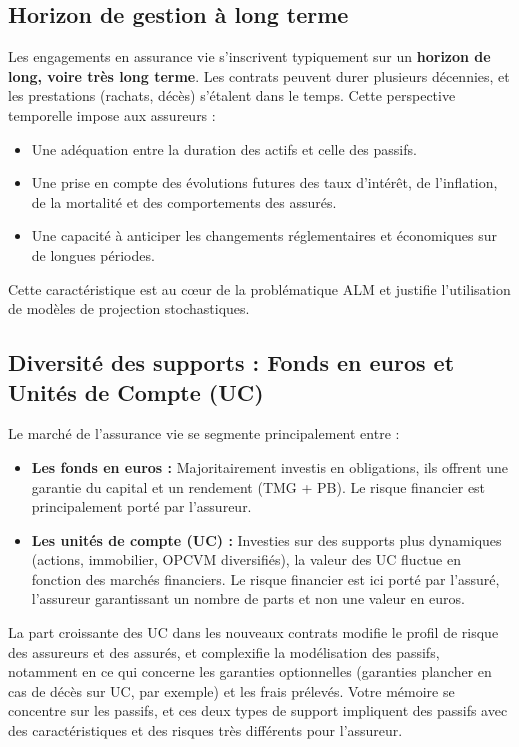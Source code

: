 \subsection{Horizon de gestion à long terme}
\label{subsec:horizon_long_terme}
Les engagements en assurance vie s'inscrivent typiquement sur un \textbf{horizon de long, voire très long terme}. Les contrats peuvent durer plusieurs décennies, et les prestations (rachats, décès) s'étalent dans le temps. Cette perspective temporelle impose aux assureurs :
\begin{itemize}
    \item Une adéquation entre la duration des actifs et celle des passifs.
    \item Une prise en compte des évolutions futures des taux d'intérêt, de l'inflation, de la mortalité et des comportements des assurés.
    \item Une capacité à anticiper les changements réglementaires et économiques sur de longues périodes.
\end{itemize}
Cette caractéristique est au cœur de la problématique ALM et justifie l'utilisation de modèles de projection stochastiques.

\subsection{Diversité des supports : Fonds en euros et Unités de Compte (UC)}
\label{subsec:fonds_euros_uc}
Le marché de l'assurance vie se segmente principalement entre :
\begin{itemize}
    \item \textbf{Les fonds en euros :} Majoritairement investis en obligations, ils offrent une garantie du capital et un rendement (TMG + PB). Le risque financier est principalement porté par l'assureur.
    \item \textbf{Les unités de compte (UC) :} Investies sur des supports plus dynamiques (actions, immobilier, OPCVM diversifiés), la valeur des UC fluctue en fonction des marchés financiers. Le risque financier est ici porté par l'assuré, l'assureur garantissant un nombre de parts et non une valeur en euros.
\end{itemize}
La part croissante des UC dans les nouveaux contrats modifie le profil de risque des assureurs et des assurés, et complexifie la modélisation des passifs, notamment en ce qui concerne les garanties optionnelles (garanties plancher en cas de décès sur UC, par exemple) et les frais prélevés. Votre mémoire se concentre sur les passifs, et ces deux types de support impliquent des passifs avec des caractéristiques et des risques très différents pour l'assureur.

